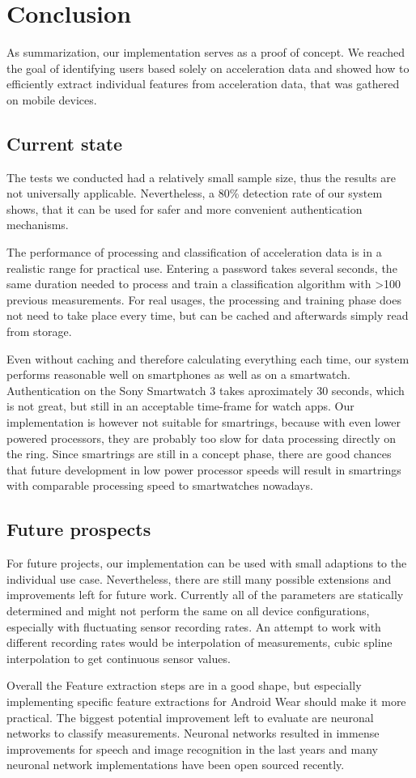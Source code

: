 \chapter{Conclusion}\label{chapter:conclusion}
As summarization, our implementation serves as a proof of concept. We reached the goal of identifying users based solely on acceleration data and showed how to efficiently extract individual features from acceleration data, that was gathered on mobile devices.

\section{Current state}
The tests we conducted had a relatively small sample size, thus the results are not universally applicable. Nevertheless, a 80\% detection rate of our system shows, that it can be used for safer and more convenient authentication mechanisms. %

The performance of processing and classification of acceleration data is in a realistic range for practical use. Entering a password takes several seconds, \ie the same duration needed to process and train a classification algorithm with >100 previous measurements. For real usages, the processing and training phase does not need to take place every time, but can be cached and afterwards simply read from storage.

Even without caching and therefore calculating everything each time, our system performs reasonable well on smartphones as well as on a smartwatch. Authentication on the Sony Smartwatch 3 takes aproximately 30 seconds, which is not great, but still in an acceptable time-frame for watch \glspl{app}. Our implementation is however not suitable for smartrings, because with even lower powered processors, they are probably too slow for data processing directly on the ring. Since smartrings are still in a concept phase, there are good chances that future development in low power processor speeds will result in smartrings with comparable processing speed to smartwatches nowadays.

\section{Future prospects}
For future projects, our implementation can be used with small adaptions to the individual use case. Nevertheless, there are still many possible extensions and improvements left for future work. Currently all of the parameters are statically determined and might not perform the same on all device configurations, especially with fluctuating sensor recording rates. An attempt to work with different recording rates would be interpolation of measurements, \eg cubic spline interpolation to get continuous sensor values.

Overall the Feature extraction steps are in a good shape, but especially implementing specific feature extractions for Android Wear should make it more practical. The biggest potential improvement left to evaluate are neuronal networks to classify measurements. Neuronal networks resulted in immense improvements for speech and image recognition in the last years and many neuronal network implementations have been open sourced recently.
